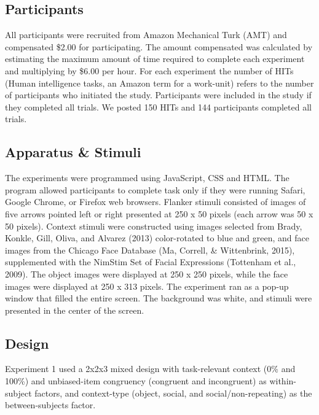 \documentclass[english,,man,floatsintext]{apa6}
\begin{document}
\hypertarget{participants}{%
\subsection{Participants}\label{participants}}

All participants were recruited from Amazon Mechanical Turk (AMT) and compensated \$2.00 for participating. The amount compensated was calculated by estimating the maximum amount of time required to complete each experiment and multiplying by \$6.00 per hour. For each experiment the number of HITs (Human intelligence tasks, an Amazon term for a work-unit) refers to the number of participants who initiated the study. Participants were included in the study if they completed all trials. We posted 150 HITs and 144 participants completed all trials.

\hypertarget{apparatus-stimuli}{%
\subsection{Apparatus \& Stimuli}\label{apparatus-stimuli}}

The experiments were programmed using JavaScript, CSS and HTML. The program allowed participants to complete task only if they were running Safari, Google Chrome, or Firefox web browsers. Flanker stimuli consisted of images of five arrows pointed left or right presented at 250 x 50 pixels (each arrow was 50 x 50 pixels). Context stimuli were constructed using images selected from Brady, Konkle, Gill, Oliva, and Alvarez (2013) color-rotated to blue and green, and face images from the Chicago Face Database (Ma, Correll, \& Wittenbrink, 2015), supplemented with the NimStim Set of Facial Expressions (Tottenham et al., 2009). The object images were displayed at 250 x 250 pixels, while the face images were displayed at 250 x 313 pixels. The experiment ran as a pop-up window that filled the entire screen. The background was white, and stimuli were presented in the center of the screen.

\hypertarget{design}{%
\subsection{Design}\label{design}}

Experiment 1 used a 2x2x3 mixed design with task-relevant context (0\% and 100\%) and unbiased-item congruency (congruent and incongruent) as within-subject factors, and context-type (object, social, and social/non-repeating) as the between-subjects factor.
\end{document}
